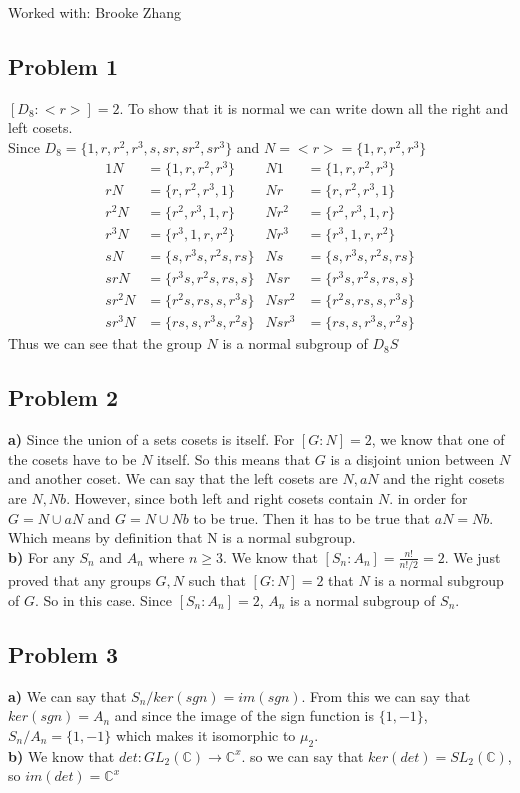 \documentclass[12pt]{article}
\newcommand{\C}{\mathbb{C}}
\begin{document}
Worked with: Brooke Zhang
\subsection*{Problem 1}
$[D_8:<r>] = 2$. To show that it is normal we can write down all the right and left cosets.\\
Since $D_8 = \{1,r,r^2,r^3,s,sr,sr^2,sr^3\}$ and $N = <r> = \{ 1,r,r^2,r^3 \}$
\begin{align*}
1N&=\{1,r,r^2,r^3\}		&		N1&=\{1,r,r^2,r^3\}\\
rN&=\{r,r^2,r^3,1\}		&		Nr&=\{r,r^2,r^3,1\}\\
r^2N&=\{r^2,r^3,1,r\}		&		Nr^2&=\{r^2,r^3,1,r\}\\
r^3N&=\{r^3,1,r,r^2\}		&		Nr^3&=\{r^3,1,r,r^2\}\\
sN&=\{s, r^3s, r^2s, rs\}		&		Ns&=\{s, r^3s, r^2s, rs\}\\
srN&=\{r^3s, r^2s, rs, s\}		&		Nsr&=\{r^3s, r^2s, rs, s\}\\
sr^2N&=\{r^2s, rs, s, r^3s\}		&		Nsr^2&=\{r^2s, rs, s, r^3s\}\\
sr^3N&=\{rs, s, r^3s, r^2s\}		&		Nsr^3&=\{rs, s, r^3s, r^2s\}
\end{align*}
Thus we can see that the group $N$ is a normal subgroup of $D_8S$
\subsection*{Problem 2}
\textbf{a) } Since the union of a sets cosets is itself. For $[G:N]=2$, we know that one of the cosets have to be $N$ itself. So this means that $G$ is a disjoint union between $N$ and another coset. We can say that the left cosets are $N,aN$ and the right cosets are $N,Nb$. However, since both left and right cosets contain $N$. in order for $G = N \cup aN$ and $G = N \cup Nb$ to be true. Then it has to be true that $aN = Nb$. Which means by definition that N is a normal subgroup. \\
\textbf{b)} For any $S_n$ and $A_n$ where $n \geq 3$. We know that $[S_n:A_n] = \frac{n!}{n!/2} = 2$. We just proved that any groups $G,N$ such that $[G:N]=2$ that $N$ is a normal subgroup of $G$. So in this case. Since $[S_n:A_n] = 2$, $A_n$ is a normal subgroup of $S_n$. 
\subsection*{Problem 3}
\textbf{a) }  We can say that $S_n/ker(sgn) = im(sgn)$. From this we can say that $ker(sgn) = A_n$ and since the image of the sign function is $\{ 1,-1 \}$, $S_n/A_n = \{1,-1\}$ which makes it isomorphic to $\mu_2$.\\
\textbf{b) }  We know that $det: GL_2(\C) \rightarrow \C^x$. so we can say that $ker(det) = SL_2(\C)$, so $im(det) = \C^x$
\newpage
\end{document}
